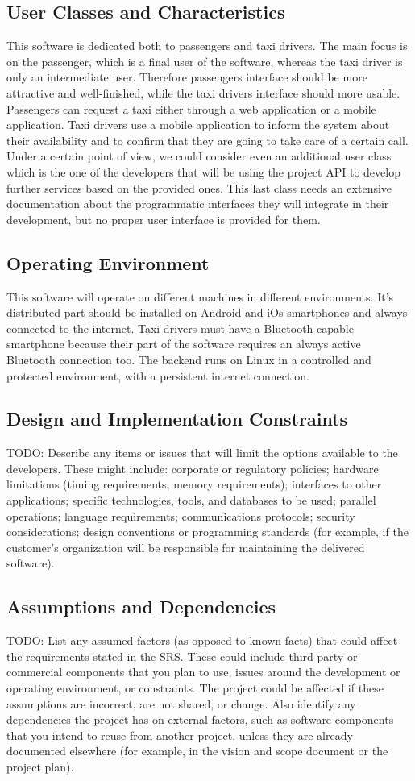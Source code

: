 \subsection{User Classes and Characteristics}
This software is dedicated both to passengers and taxi drivers. The main focus is on the passenger, which is a final user of the software, whereas the taxi driver is only an intermediate user. Therefore passengers interface should be more attractive and well-finished, while the taxi drivers interface should more usable.
Passengers can request a taxi either through a web application or a mobile application.
Taxi drivers use a mobile application to inform the system about their availability and to confirm that they are going to take care of a certain call.
Under a certain point of view, we could consider even an additional user class which is the one of the developers that will be using the project API to develop further services based on the provided ones.
This last class needs an extensive documentation about the programmatic interfaces they will integrate in their development, but no proper user interface is provided for them.
\subsection{Operating Environment}
This software will operate on different machines in different environments. It's distributed part should be installed on Android and iOs smartphones and always connected to the internet. Taxi drivers must have a Bluetooth capable smartphone because their part of the software requires an always active Bluetooth connection too.
The backend runs on Linux in a controlled and protected environment, with a persistent internet connection.
\subsection{Design and Implementation Constraints}
TODO: Describe any items or issues that will limit the options available to the developers. These might include: corporate or regulatory policies; hardware limitations (timing requirements, memory requirements); interfaces to other applications; specific technologies, tools, and databases to be used; parallel operations; language requirements; communications protocols; security considerations; design conventions or programming standards (for example, if the customer’s organization will be responsible for maintaining the delivered software).
\subsection{Assumptions and Dependencies}
TODO: List any assumed factors (as opposed to known facts) that could affect the requirements stated in the SRS. These could include third-party or commercial components that you plan to use, issues around the development or operating environment, or constraints. The project could be affected if these assumptions are incorrect, are not shared, or change. Also identify any dependencies the project has on external factors, such as software components that you intend to reuse from another project, unless they are already documented elsewhere (for example, in the vision and scope document or the project plan).